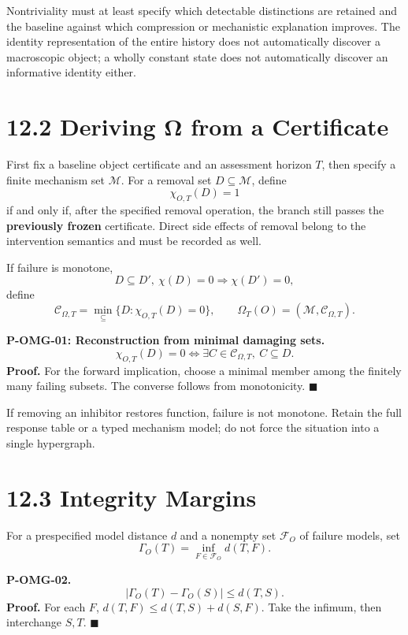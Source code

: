 \documentclass[
  english,
  11pt,
  oneside]{book}
\newcounter{none} %
\begin{document}
Nontriviality must at least specify which detectable distinctions are retained and the baseline against which compression or mechanistic explanation improves. The identity representation of the entire history does not automatically discover a macroscopic object; a wholly constant state does not automatically discover an informative identity either.

\section{12.2 Deriving Ω from a Certificate}\label{deriving-ux3c9-from-a-certificate}

First fix a baseline object certificate and an assessment horizon \(T\), then specify a finite mechanism set \(\mathcal M\). For a removal set \(D\subseteq\mathcal M\), define \[\chi_{O,T}(D)=1\] if and only if, after the specified removal operation, the branch still passes the \textbf{previously frozen} certificate. Direct side effects of removal belong to the intervention semantics and must be recorded as well.

If failure is monotone, \[D\subseteq D',\ \chi(D)=0\Rightarrow\chi(D')=0,\] define \[\mathcal C_{\Omega,T}=\min_{\subseteq}\{D:\chi_{O,T}(D)=0\},
\qquad
\Omega_T(O)=(\mathcal M,\mathcal C_{\Omega,T}).\]

\hypertarget{p-omg-01}{}\label{p-omg-01}

\textbf{P-OMG-01: Reconstruction from minimal damaging sets.} \[\chi_{O,T}(D)=0
\iff \exists C\in\mathcal C_{\Omega,T},\ C\subseteq D.\] \textbf{Proof.} For the forward implication, choose a minimal member among the finitely many failing subsets. The converse follows from monotonicity. \(\blacksquare\)

If removing an inhibitor restores function, failure is not monotone. Retain the full response table or a typed mechanism model; do not force the situation into a single hypergraph.

\section{12.3 Integrity Margins}\label{integrity-margins}

For a prespecified model distance \(d\) and a nonempty set \(\mathcal F_O\) of failure models, set \[\Gamma_O(T)=\inf_{F\in\mathcal F_O}d(T,F).\]

\hypertarget{p-omg-02}{}\label{p-omg-02}

\textbf{P-OMG-02.} \[|\Gamma_O(T)-\Gamma_O(S)|\le d(T,S).\] \textbf{Proof.} For each \(F\), \(d(T,F)\le d(T,S)+d(S,F)\). Take the infimum, then interchange \(S,T\). \(\blacksquare\)
\end{document}
